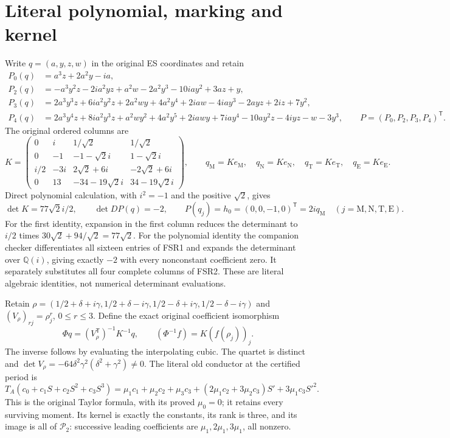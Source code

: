 \documentclass[11pt]{article}
\begin{document}
\section{Literal polynomial, marking and kernel}
Write $q=(a,y,z,w)$ in the original ES coordinates and retain
\[
\begin{aligned}
 P_0(q)&=a^3z+2a^2y-ia,\\
 P_2(q)&=-a^3y^2z-2ia^2yz+a^2w-2a^2y^3-10iay^2+3az+y,\\
 P_3(q)&=2a^3y^3z+6ia^2y^2z+2a^2wy+4a^2y^4
          +2iaw-4iay^3-2ayz+2iz+7y^2,\\
 P_4(q)&=2a^3y^4z+8ia^2y^3z+a^2wy^2+4a^2y^5
          +2iawy+7iay^4-10ay^2z-4iyz-w-3y^3,
 \qquad P=(P_0,P_2,P_3,P_4)^{\mathsf T}.
\end{aligned}\tag{FSR1}
\]
The original ordered columns are
\[
 K=\begin{pmatrix}
 0&i&1/\sqrt2&1/\sqrt2\\
 0&-1&-1-\sqrt2i&1-\sqrt2i\\
 i/2&-3i&2\sqrt2+6i&-2\sqrt2+6i\\
 0&13&-34-19\sqrt2i&34-19\sqrt2i
 \end{pmatrix},\qquad
 q_{\mathrm M}=Ke_{\mathrm M},\quad q_{\mathrm N}=Ke_{\mathrm N},
 \quad q_{\mathrm T}=Ke_{\mathrm T},\quad q_{\mathrm E}=Ke_{\mathrm E}.
 \tag{FSR2}
\]
Direct polynomial calculation, with $i^2=-1$ and the positive
$\sqrt2$, gives
\[
 \det K=77\sqrt2i/2,\qquad \det DP(q)=-2,\qquad
 P(q_j)=h_0=(0,0,-1,0)^{\mathsf T}=2iq_{\mathrm M}
       \quad(j=\mathrm M,\mathrm N,\mathrm T,\mathrm E).
 \tag{FSR3}
\]
For the first identity, expansion in the first column reduces
the determinant to $i/2$ times $30\sqrt2+94/\sqrt2=77\sqrt2$.
For the polynomial identity the companion checker differentiates
all sixteen entries of FSR1 and expands the determinant over
$\mathbb Q(i)$, giving exactly $-2$ with every nonconstant
coefficient zero. It separately substitutes all four complete
columns of FSR2. These are literal algebraic identities, not
numerical determinant evaluations.

Retain
$\rho=(1/2+\delta+i\gamma,1/2+\delta-i\gamma,
1/2-\delta+i\gamma,1/2-\delta-i\gamma)$ and
$(V_\rho)_{rj}=\rho_j^r$, $0\le r\le3$. Define the exact original
coefficient isomorphism
\[
 \Phi q=(V_\rho^{\mathsf T})^{-1}K^{-1}q,
 \qquad (\Phi^{-1}f)=K(f(\rho_j))_j.
 \tag{FSR4}
\]
The inverse follows by evaluating the interpolating cubic. The
quartet is distinct and
$\det V_\rho=-64\delta^2\gamma^2(\delta^2+\gamma^2)\ne0$.
The literal old conductor at the certified period is
\[
 T_A(c_0+c_1S+c_2S^2+c_3S^3)
  =\mu_1c_1+\mu_2c_2+\mu_3c_3
        +(2\mu_1c_2+3\mu_2c_3)S'+3\mu_1c_3S'^2.
 \tag{FSR5}
\]
This is the original Taylor formula, with its proved $\mu_0=0$;
it retains every surviving moment. Its kernel is exactly the
constants, its rank is three, and its image is all of
$\mathcal P_2$: successive leading coefficients are
$\mu_1,2\mu_1,3\mu_1$, all nonzero.
\end{document}
